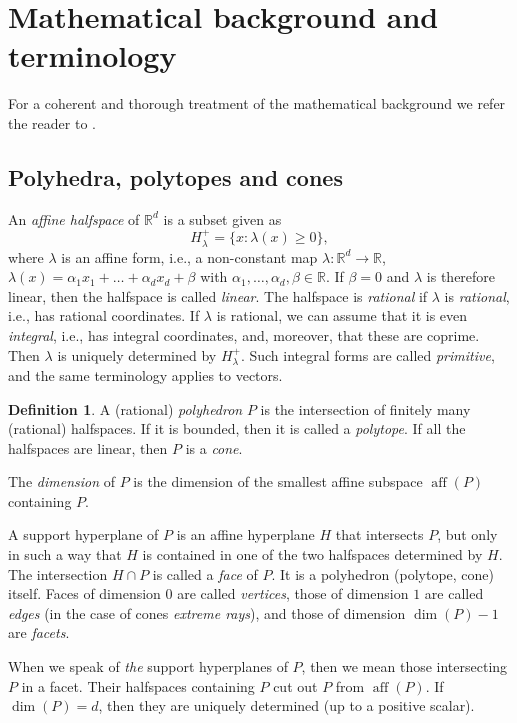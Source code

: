 \documentclass[12pt,a4paper]{scrartcl}
\theoremstyle{definition}
\newtheorem{definition}[theorem]{Definition}
\def\RR{{\mathbb R}}
\DeclareMathOperator{\aff}{aff}
\begin{document}
\newpage

\appendix

\section{Mathematical background and terminology}

For a coherent and thorough treatment of the mathematical background we refer the reader to \cite{BG}.

\subsection{Polyhedra, polytopes and cones}

An \emph{affine halfspace} of $\RR^d$ is a subset given as
$$
H_\lambda^+=\{x: \lambda(x)\ge 0\},
$$
where $\lambda$ is an affine form, i.e., a non-constant map $\lambda:\RR^d\to\RR$, $\lambda(x)=\alpha_1x_1+\dots+\alpha_dx_d+\beta$ with $\alpha_1,\dots,\alpha_d,\beta\in\RR$. If $\beta=0$ and $\lambda$ is therefore linear, then the halfspace is called \emph{linear}. The halfspace is \emph{rational} if $\lambda$ is \emph{rational},  i.e., has rational coordinates. If $\lambda$ is rational, we can assume that it is even \emph{integral}, i.e., has integral coordinates, and, moreover, that these are coprime. Then $\lambda$ is uniquely determined by $H_\lambda^+$. Such integral  forms are called \emph{primitive}, and the same terminology applies to vectors.

\begin{definition}
	A (rational) \emph{polyhedron} $P$ is the intersection of finitely many (rational) halfspaces. If it is bounded, then it is called a \emph{polytope}. If all the halfspaces are linear, then $P$ is a \emph{cone}.
	
	The \emph{dimension} of $P$ is the dimension of the smallest affine subspace $\aff(P)$ containing $P$.
\end{definition}


A support hyperplane of $P$ is an affine hyperplane $H$ that intersects $P$, but only in such a way that $H$ is contained in one of the two halfspaces determined by $H$. The intersection $H\cap P$ is called a \emph{face} of $P$. It is a polyhedron (polytope, cone) itself. Faces of dimension $0$ are called \emph{vertices}, those of dimension $1$ are called \emph{edges} (in the case of cones \emph{extreme rays}), and those of dimension $\dim(P)-1$ are \emph{facets}.

When we speak of \emph{the} support hyperplanes of $P$, then we mean those intersecting $P$ in a facet. Their halfspaces containing $P$ cut out $P$ from $\aff(P)$. If $\dim(P)=d$, then they are uniquely determined (up to a positive scalar).
\end{document}
